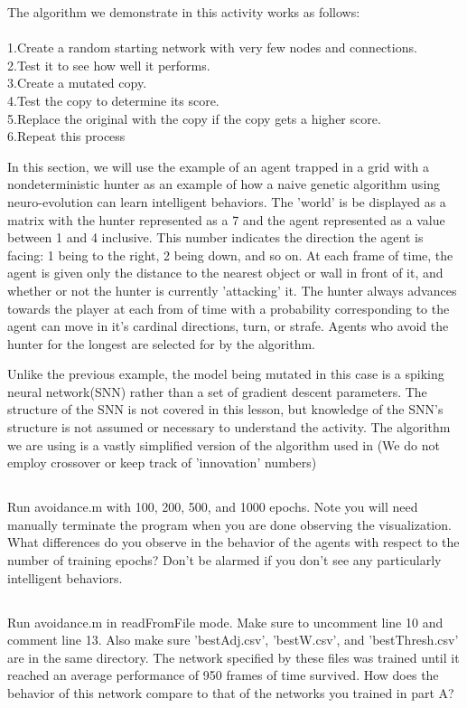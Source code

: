 \documentclass[12]{extarticle}
\begin{document}
The algorithm we demonstrate in this activity works as follows: \\
\\
1.Create a random starting network with very few nodes and connections.\\ 
2.Test it to see how well it performs. \\
3.Create a mutated copy. \\
4.Test the copy to determine its score. \\
5.Replace the original with the copy if the copy gets a higher score.\\
6.Repeat this process

In this section, we will use the example of an agent trapped in a grid with a nondeterministic hunter as an example of how a naive genetic algorithm using neuro-evolution can learn intelligent behaviors. The 'world' is be displayed as a matrix with the hunter represented as a 7 and the agent represented as a value between 1 and 4 inclusive. This number indicates the direction the agent is facing: 1 being to the right, 2 being down, and so on. At each frame of time, the agent is given only the distance to the nearest object or wall in front of it, and whether or not the hunter is currently 'attacking' it. The hunter always advances towards the player at each from of time with a probability corresponding to the agent can move in it's cardinal directions, turn, or strafe. Agents who avoid the hunter for the longest are selected for by the algorithm. 

Unlike the previous example, the model being mutated in this case is a spiking neural network(SNN) rather than a set of gradient descent parameters. The structure of the SNN is not covered in this lesson, but knowledge of the SNN's structure is not assumed or necessary to understand the activity. The algorithm we are using is a vastly simplified version of the algorithm used in \cite{Stanley}(We do not employ crossover or keep track of 'innovation' numbers)
\subsection{}
Run avoidance.m with 100, 200, 500, and 1000 epochs. Note you will need manually terminate the program when you are done observing the visualization.  What differences do you observe in the behavior of the agents with respect to the number of training epochs? Don't be alarmed if you don't see any particularly intelligent behaviors.
\subsection{}
Run avoidance.m in readFromFile mode. Make sure to uncomment line 10 and comment line 13. Also make sure 'bestAdj.csv', 'bestW.csv', and 'bestThresh.csv' are in the same directory. The network specified by these files was trained until it reached an average performance of 950 frames of time survived. How does the behavior of this network compare to that of the networks you trained in part A?
\end{document}
